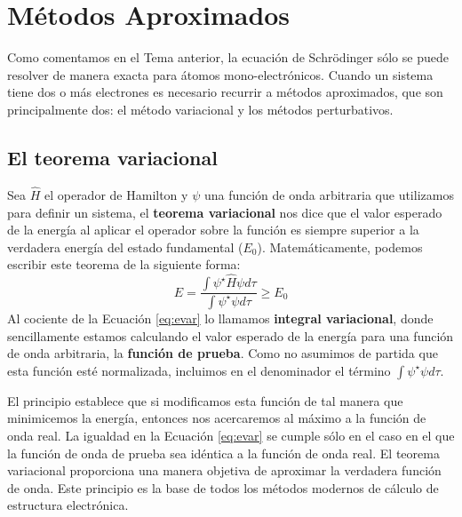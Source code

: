 \chapter{Métodos Aproximados}
Como comentamos en el Tema anterior, la ecuación de 
Schrödinger sólo se puede resolver de manera exacta 
para átomos mono-electrónicos. Cuando un sistema tiene 
dos o más electrones es necesario recurrir
a métodos aproximados, que son principalmente dos: el
método variacional y los métodos perturbativos. 

\section{El teorema variacional}
Sea $\hat{H}$ el operador de Hamilton y $\psi$ una función 
de onda arbitraria que utilizamos para definir un sistema, 
el \textbf{teorema variacional} nos dice que el valor 
esperado de la energía al aplicar el operador
sobre la función es siempre superior a la verdadera 
energía del estado fundamental ($E_0$). Matemáticamente, 
podemos escribir este teorema de la siguiente forma:
\begin{equation}
    E=\frac{\int{\psi^\star\hat{H}\psi d\tau}}{\int{\psi^\star \psi d\tau}} \geq E_0
    \label{eq:evar}
\end{equation}
Al cociente de la Ecuación \ref{eq:evar} lo llamamos
\textbf{integral variacional}, donde sencillamente estamos 
calculando el valor esperado de la energía para una función de
onda arbitraria, la \textbf{función de prueba}. Como no 
asumimos de partida que esta función esté normalizada,
incluimos en el denominador el término 
${\int{\psi^\star \psi d\tau}}$. 

El principio establece
que si modificamos esta función de tal manera que minimicemos
la energía, entonces nos acercaremos al máximo a la función 
de onda real. La igualdad en la Ecuación \ref{eq:evar} se 
cumple sólo en el caso en el que la función de onda de prueba 
sea idéntica a la función de onda real. El teorema variacional
proporciona una manera objetiva de aproximar la verdadera función
de onda. Este principio es la base de todos los métodos modernos
de  cálculo de estructura electrónica.

